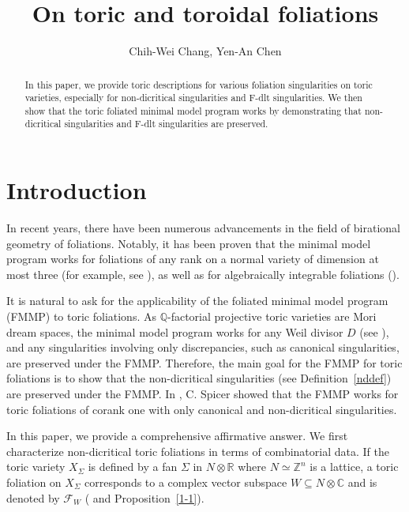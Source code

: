 \documentclass[12pt,reqno]{amsart}
\title{On toric and toroidal foliations}
\author{Chih-Wei Chang, Yen-An Chen}
\theoremstyle{definition}
\newcommand{\mc}{\mathcal}
\newcommand{\mb}{\mathbb}
\newcommand\bQ{{\mathbb Q}}
\begin{document}
\maketitle

\begin{abstract}
    In this paper, we provide toric descriptions for various foliation singularities on toric varieties, especially for non-dicritical singularities and F-dlt singularities. 
We then show that the toric foliated minimal model program works by demonstrating that non-dicritical singularities and F-dlt singularities are preserved.
\end{abstract}

\tableofcontents

\section{Introduction}\label{sec:intro}
In recent years, there have been numerous advancements in the field of birational geometry of foliations. 
Notably, it has been proven that the minimal model program works for foliations of any rank on a normal variety of dimension at most three (for example, see \cite{mendes2000kodaira, brunella2015birational, mcquillan2005semi, mcquillan2008canonical, spicer2020higher, CS, cascini2025mmp, spicer2022local}), as well as for algebraically integrable foliations (\cite{ambro2021positivity, cascini2023mmp, CHLX, LMX, M7}).

It is natural to ask for the applicability of the foliated minimal model program (FMMP) to toric foliations. 
As $\bQ$-factorial projective toric varieties are Mori dream spaces, the minimal model program works for any Weil divisor $D$ (see \cite{hu2000mori}), and any singularities involving only discrepancies, such as canonical singularities, are preserved under the FMMP. 
Therefore, the main goal for the FMMP for toric foliations is to show that the non-dicritical singularities (see Definition~\ref{nddef}) are preserved under the FMMP. 
In \cite{spicer2020higher}, C. Spicer showed that the FMMP works for toric foliations of corank one with only canonical and non-dicritical singularities. 
 
In this paper, we provide a comprehensive affirmative answer. We first characterize non-dicritical toric foliations in terms of combinatorial data. If the toric variety $X_\Sigma$ is defined by a fan $\Sigma$ in $N\otimes\mb R$ where $N\simeq\mb Z^n$ is a lattice, a toric foliation on $X_\Sigma$ corresponds to a complex vector subspace $W\subseteq N\otimes\mb C$ and is denoted by $\mc F_W$ (\cite{wang2023toric} and Proposition~\ref{1-1}). 
\end{document}
